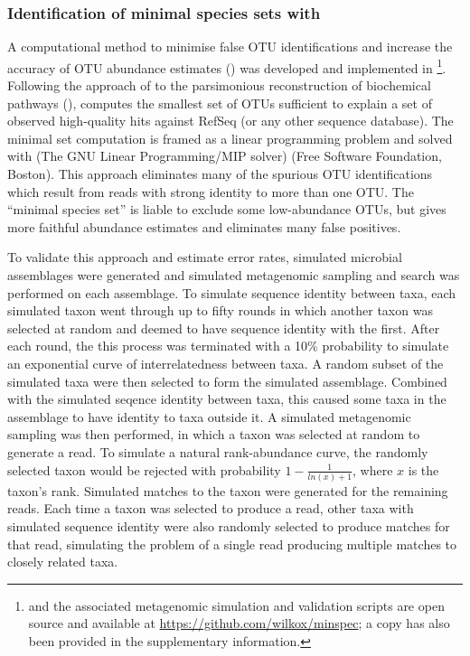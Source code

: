 \subsubsection{Identification of minimal species sets with }

A computational method to minimise false \ac{OTU} identifications and increase the accuracy of \ac{OTU} abundance estimates () was developed and implemented in \footnote{ and the associated metagenomic simulation and validation scripts are open source and available at \url{https://github.com/wilkox/minspec}; a copy has also been provided in the supplementary information.}.
Following the approach of \citet{Ye:2009bl} to the parsimonious reconstruction of biochemical pathways (),  computes the smallest set of OTUs sufficient to explain a set of observed high-quality hits against RefSeq (or any other sequence database).
The minimal set computation is framed as a linear programming problem and solved with  (The GNU Linear Programming/MIP solver) (Free Software Foundation, Boston).
This approach eliminates many of the spurious \ac{OTU} identifications which result from reads with strong identity to more than one \ac{OTU}. 
The ``minimal species set'' is liable to exclude some low-abundance \acp{OTU}, but gives more faithful abundance estimates and eliminates many false positives.

To validate this approach and estimate error rates, simulated microbial assemblages were generated and simulated metagenomic sampling and  search was performed on each assemblage.
To simulate sequence identity between taxa, each simulated taxon went through up to fifty rounds in which another taxon was selected at random and deemed to have sequence identity with the first.
After each round, the this process was terminated with a 10\% probability to simulate an exponential curve of interrelatedness between taxa.
A random subset of the simulated taxa were then selected to form the simulated assemblage.
Combined with the simulated seqence identity between taxa, this caused some taxa in the assemblage to have identity to taxa outside it.
A simulated metagenomic sampling was then performed, in which a taxon was selected at random to generate a read.
To simulate a natural rank-abundance curve, the randomly selected taxon would be rejected with probability $1 - \frac{1}{ln(x)+1}$, where $x$ is the taxon's rank.
Simulated  matches to the taxon were generated for the remaining reads.
Each time a taxon was selected to produce a read, other taxa with simulated sequence identity were also randomly selected to produce  matches for that read, simulating the problem of a single read producing multiple matches to closely related taxa.

